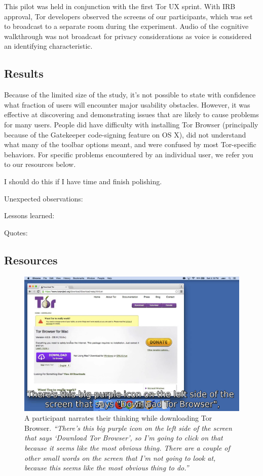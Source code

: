 \documentclass[letterpaper,twocolumn,11pt]{article}
\begin{document}
This pilot was held in conjunction with the first Tor UX sprint. With IRB approval, Tor developers
observed the screens of our participants, which was set to broadcast to a separate  
room during the experiment. Audio of the cognitive walkthrough was not broadcast for privacy
considerations as voice is considered an identifying characteristic.

\subsection{Results}
\indent \indent Because of the limited size of the study, it's not possible to state with confidence what 
fraction of users will encounter major usability obstacles. However, it was effective at discovering 
and demonstrating issues that are likely to cause problems for many users. 
People did have difficulty with installing Tor Browser (principally because of the Gatekeeper 
code-signing feature on OS X), did not understand what many of the toolbar options meant, 
and were confused by most Tor-specific behaviors. For specific problems 
encountered by an individual user, we refer you to our resources below. 

{\color {red}
I should do this if I have time and finish polishing. 

Unexpected observations: 

Lessons learned: 

Quotes: 
}

\subsection{Resources}

\begin{figure}
\includegraphics[width=\linewidth]{walkthrough.png}
\caption{
A participant narrates their thinking
while downloading Tor Browser.
{
\it
``There's this big purple icon on the left side of the screen that says `Download Tor Browser',
so I'm going to click on that because it seems like the most obvious thing.
There are a couple of other small words on the screen that I'm not going to look at, because this seems like the most obvious thing to do.''
}
}
\label{walkthrough}
\end{figure}
\end{document}
